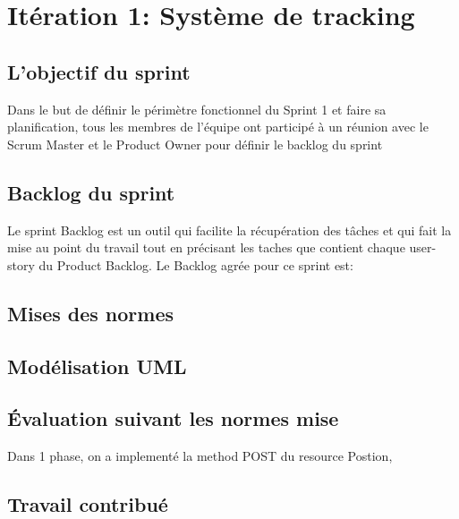 \section{Itération 1: Système de tracking}

\subsection{L'objectif du sprint}
Dans le but de définir le périmètre fonctionnel du Sprint 1 et faire
sa planification, tous les membres de l'équipe ont participé à un réunion
avec le Scrum Master et le Product Owner pour définir le backlog du sprint 
\subsection{Backlog du sprint}
Le sprint Backlog est un outil qui facilite la récupération des tâches et qui fait
la mise au point du travail tout en précisant les taches que contient chaque 
user-story du Product Backlog.
Le Backlog agrée pour ce sprint est:
\subsection{Mises des normes}


\subsection{Modélisation UML}
\subsection{Évaluation suivant les normes mise}

Dans 1\ier{} phase, on a implementé la method POST du resource Postion,

\subsection{Travail contribué}

